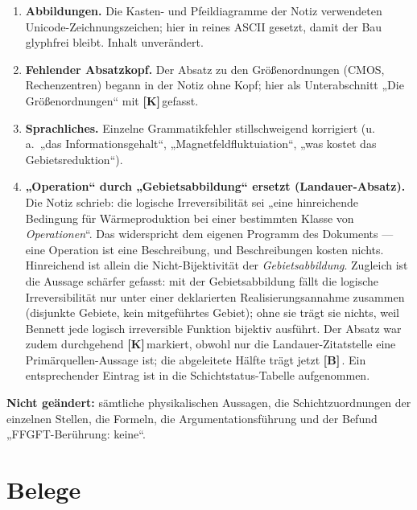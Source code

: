 \documentclass[11pt,a4paper]{article}
\newcommand{\LK}{\textcolor{layK}{\textbf{\footnotesize\textsf{[K]}}}\,}
\newcommand{\LB}{\textcolor{layB}{\textbf{\footnotesize\textsf{[B]}}}\,}
\begin{document}
\begin{enumerate}[leftmargin=1.6em,itemsep=0.4em]
        die logische Reihenfolge gebracht (Hardware $\ne$ Rechenoperation, dann
        Hardware-Seite, dann Dauerbetrieb, dann Quantencomputer) und als
        Unterabschnitte von Abschnitt~\ref{sec:inhalt} geführt.
  \item \textbf{Abbildungen.} Die Kasten- und Pfeildiagramme der Notiz verwendeten
        Unicode-Zeichnungszeichen; hier in reines ASCII gesetzt, damit der Bau
        glyphfrei bleibt. Inhalt unverändert.
  \item \textbf{Fehlender Absatzkopf.} Der Absatz zu den Größenordnungen
        (CMOS, Rechenzentren) begann in der Notiz ohne Kopf; hier als
        Unterabschnitt „Die Größenordnungen“ mit \LK gefasst.
  \item \textbf{Sprachliches.} Einzelne Grammatikfehler stillschweigend
        korrigiert (u.\,a.\ „das Informationsgehalt“, „Magnetfeldfluktuiation“,
        „was kostet das Gebietsreduktion“).
  \item \textbf{„Operation“ durch „Gebietsabbildung“ ersetzt (Landauer-Absatz).}
        Die Notiz schrieb: die logische Irreversibilität sei „eine hinreichende
        Bedingung für Wärmeproduktion bei einer bestimmten Klasse von
        \emph{Operationen}“. Das widerspricht dem eigenen Programm des Dokuments
        --- eine Operation ist eine Beschreibung, und Beschreibungen kosten
        nichts. Hinreichend ist allein die Nicht-Bijektivität der
        \emph{Gebietsabbildung}. Zugleich ist die Aussage schärfer gefasst: mit
        der Gebietsabbildung fällt die logische Irreversibilität nur unter einer
        deklarierten Realisierungsannahme zusammen (disjunkte Gebiete, kein
        mitgeführtes Gebiet); ohne sie trägt sie nichts, weil Bennett jede logisch
        irreversible Funktion bijektiv ausführt. Der Absatz war zudem
        durchgehend \LK markiert, obwohl nur die Landauer-Zitatstelle eine
        Primärquellen-Aussage ist; die abgeleitete Hälfte trägt jetzt \LB. Ein
        entsprechender Eintrag ist in die Schichtstatus-Tabelle aufgenommen.
\end{enumerate}

\textbf{Nicht geändert:} sämtliche physikalischen Aussagen, die Schichtzuordnungen
der einzelnen Stellen, die Formeln, die Argumentationsführung und der Befund
„FFGFT-Berührung: keine“.

\clearpage
{}
{}
\section*{Belege}
\end{document}
